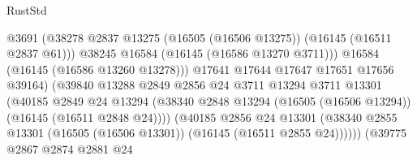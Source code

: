 \begin{lexlean}{RustStd}
\begin{coremodule}
                                              @3691
                                              (@38278
                                                @2837
                                                @13275
                                                (@16505 (@16506 @13275))
                                                (@16145 (@16511 @2837 @61)))
                                              @38245
                                              @16584
                                              (@16145 (@16586 @13270 @3711)))
                                            @16584
                                            (@16145 (@16586 @13260 @13278)))
                                          @17641
                                          @17644
                                          @17647
                                          @17651
                                          @17656
                                          @39164)
                                        (@39840
                                          @13288
                                          @2849
                                          @2856
                                          @24
                                          @3711
                                          @13294
                                          @3711
                                          @13301
                                          (@40185
                                            @2849
                                            @24
                                            @13294
                                            (@38340
                                              @2848
                                              @13294
                                              (@16505 (@16506 @13294))
                                              (@16145 (@16511 @2848 @24))))
                                          (@40185
                                            @2856
                                            @24
                                            @13301
                                            (@38340
                                              @2855
                                              @13301
                                              (@16505 (@16506 @13301))
                                              (@16145 (@16511 @2855 @24))))))
                                      (@39775
                                        @2867
                                        @2874
                                        @2881
                                        @24

\end{coremodule}
\end{lexlean}
